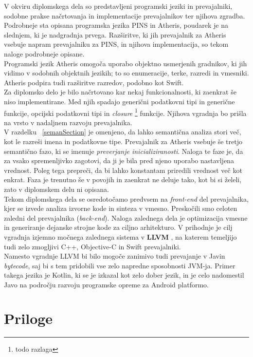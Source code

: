 \documentclass[a4paper, 12p]{book}
\begin{document}
V okviru diplomskega dela so predstavljeni programski jeziki in prevajalniki, sodobne prakse načrtovanja in implementacije prevajalnikov ter njihova zgradba. Podrobneje sta opisana programska jezika PINS in Atheris, poudarek je na slednjem, ki je nadgradnja prvega. Razširitve, ki jih prevajalnik za Atheris vsebuje napram prevajalniku za PINS, in njihova implementacija, so tekom naloge podrobneje opisane. \\
\indent Programski jezik Atheris omogoča uporabo objektno usmerjenih gradnikov, ki jih vidimo v sodobnih objektnih jezikih; to so enumeracije, terke, razredi in vmesniki. Atheris podpira tudi razširitve razredov, podobno kot Swift. \\
\indent Za diplomsko delo je bilo načrtovano kar nekaj funkcionalnosti, ki zaenkrat še niso implementirane. Med njih spadajo generični podatkovni tipi in generične funkcije, opcijski podatkovni tipi in \textit{closure} \footnote{todo razlaga} funkcije. Njihova vgradnja bo prišla na vrsto v nadaljnem razvoju prevajalnika. \\
\indent  V razdelku ~\ref{semanSection} je omenjeno, da lahko semantična analiza stori več, kot le razreši imena in podatkovne tipe. Prevajalnik za Atheris vsebuje še tretjo semantično fazo, ki se imenuje \textit{preverjanje inicializiranosti}. Naloga te faze je, da za vsako spremenljivko zagotovi, da ji je bila pred njeno uporabo nastavljena vrednost. Poleg tega prepreči, da bi lahko konstantam priredili vrednost več kot enkrat. Faza je trenutno še v povojih in zaenkrat ne deluje tako, kot bi si želeli, zato v diplomskem delu ni opisana. \\
\indent Tekom diplomskega dela se osredotočamo predvsem na \textit{front-end} del prevajalnika, kjer se izvede analiza izvorne kode in sinteza v vmesno. Preskočili smo celoten zaledni del prevajalnika (\textit{back-end}). Naloga zalednega dela je optimizacija vmesne in generiranje dejanske strojne kode za ciljno arhitekturo. V prihodnje je cilj vgradnja izjemno močnega zalednega sistema  v \textbf{LLVM} \cite{LLVM}, na katerem temeljijo tudi zelo zmogljivi C++, Objective-C in Swift prevajalniki. \\
\indent Namesto vgradnje LLVM bi bilo mogoče zanimivo tudi prevajanje v Javin \textit{bytecode}, saj bi s tem pridobili vse zelo napredne sposobnosti JVM-ja. Primer takega jezika je Kotlin, ki se je izkazal kot zelo dober jezik, in je celo nadomestil Javo na področju razvoju programske opreme za Android platformo.


\chapter{Priloge} 
\end{document}
